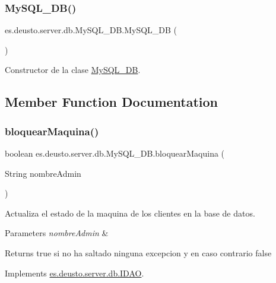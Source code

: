 \subsubsection{\texorpdfstring{MySQL\_DB()}{MySQL\_DB()}}
{\footnotesize\ttfamily es.\+deusto.\+server.\+db.\+My\+S\+Q\+L\+\_\+\+D\+B.\+My\+S\+Q\+L\+\_\+\+DB (\begin{DoxyParamCaption}{ }\end{DoxyParamCaption})}

Constructor de la clase \mbox{\hyperlink{classes_1_1deusto_1_1server_1_1db_1_1_my_s_q_l___d_b}{My\+S\+Q\+L\+\_\+\+DB}}. 

\subsection{Member Function Documentation}
\mbox{\label{classes_1_1deusto_1_1server_1_1db_1_1_my_s_q_l___d_b_a55faf265407ccfeac4078b95991d6a2f}} 
\subsubsection{\texorpdfstring{bloquearMaquina()}{bloquearMaquina()}}
{\footnotesize\ttfamily boolean es.\+deusto.\+server.\+db.\+My\+S\+Q\+L\+\_\+\+D\+B.\+bloquear\+Maquina (\begin{DoxyParamCaption}\item[{String}]{nombre\+Admin }\end{DoxyParamCaption})}

Actualiza el estado de la maquina de los clientes en la base de datos. 
\begin{DoxyParams}{Parameters}
{\em nombre\+Admin} & \\
\hline
\end{DoxyParams}
\begin{DoxyReturn}{Returns}
true si no ha saltado ninguna excepcion y en caso contrario false 
\end{DoxyReturn}


Implements \mbox{\hyperlink{interfacees_1_1deusto_1_1server_1_1db_1_1_i_d_a_o_a45cf535d7992afcdf52a1d2b3efe9d1f}{es.\+deusto.\+server.\+db.\+I\+D\+AO}}.

\mbox{\label{classes_1_1deusto_1_1server_1_1db_1_1_my_s_q_l___d_b_ab767d728176cb3c56ef6a7a3b787bff0}} 
